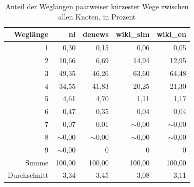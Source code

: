 \documentclass[11pt, a4paper]{article}
\begin{document}
\begin{table}[ht]
    \centering
    \begin{tabular}{*{5}{r}}
      \toprule
    Weglänge       & nl          & denews      & wiki\_sim   & wiki\_en     \\ 
      \midrule
      1            & 0,30        & 0,15        & 0,06        & 0,05         \\ 
      2            & 10,66       & 6,69        & 14,94       & 12,95        \\ 
      3            & 49,35       & 46,26       & 63,60       & 64,48        \\ 
      4            & 34,55       & 41,83       & 20,25       & 21,30        \\ 
      5            & 4,61        & 4,70        & 1,11        & 1,17         \\ 
      6            & 0,47        & 0,35        & 0,04        & 0,04         \\ 
      7            & 0,07        & 0,01        & $\sim$0,00  & $\sim$0,00   \\ 
      8            & $\sim$0,00  & $\sim$0,00  & $\sim$0,00  & $\sim$0,00   \\ 
      9            & $\sim$0,00  & 0           & 0           & 0            \\ 
      Summe        & 100,00      & 100,00      & 100,00      & 100,00       \\ 
      Durchschnitt & 3,34        & 3,45        & 3,08        & 3,11         \\
       \bottomrule
    \end{tabular}
    \caption{Anteil der Weglängen paarweiser kürzester Wege zwischen allen Knoten, in Prozent}
    \label{md-perc}
\end{table}
\end{document}
